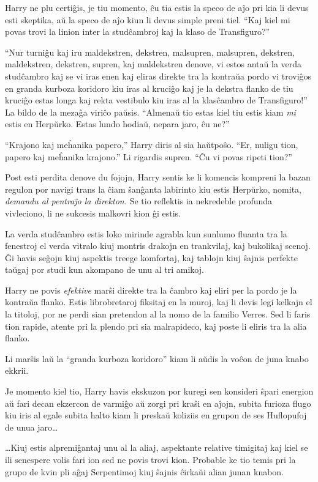 Harry ne plu certiĝis, je tiu momento, ĉu tia estis la speco de aĵo pri kia li
devus esti skeptika, aŭ la speco de aĵo kiun li devus simple preni tiel. ``Kaj
kiel mi povas trovi la linion inter la studĉambroj kaj la klaso de
Transfiguro?''

``Nur turniĝu kaj iru maldekstren, dekstren, malsupren, malsupren, dekstren,
maldekstren, dekstren, supren, kaj maldekstren denove, vi estos antaŭ la verda
studĉambro kaj se vi iras enen kaj eliras direkte tra la kontraŭa pordo vi
troviĝos en granda kurboza koridoro kiu iras al kruciĝo kaj je la dekstra flanko
de tiu kruciĝo estas longa kaj rekta vestibulo kiu iras al la klasĉambro de
Transfiguro!'' La bildo de la mezaĝa viriĉo paŭsis. ``Almenaŭ tio estas kiel tiu
estis kiam \emph{mi} estis en Herpŭrko. Estas lundo hodiaŭ, nepara jaro, ĉu
ne?''

``Krajono kaj meĥanika papero,'' Harry diris al sia haŭtpoŝo. ``Er,
nuligu tion, papero kaj meĥanika krajono.'' Li rigardis supren. ``Ĉu
vi povas ripeti tion?''

Post esti perdita denove du fojojn, Harry sentis ke li komencis kompreni la bazan
regulon por navigi trans la ĉiam ŝanĝanta labirinto kiu estis Herpŭrko, nomita,
\emph{demandu al pentraĵo la direkton.} Se tio reflektis ia nekredeble profunda
vivleciono, li ne sukcesis malkovri kion ĝi estis.

La verda studĉambro estis loko mirinde agrabla kun sunlumo fluanta tra
la fenestroj el verda vitralo kiuj montris drakojn en trankvilaj, kaj
bukolikaj scenoj. Ĝi havis seĝojn kiuj aspektis treege komfortaj, kaj
tablojn kiuj ŝajnis perfekte taŭgaj por studi kun akompano de unu al
tri amikoj. 

Harry ne povis \emph{efektive} marŝi direkte tra la ĉambro kaj eliri per la
pordo je la kontraŭa flanko. Estis librobretaroj fiksitaj en la muroj, kaj li
devis legi kelkajn el la titoloj, por ne perdi sian pretendon al la nomo de la
familio Verres. Sed li faris tion rapide, atente pri la plendo pri sia
malrapideco, kaj poste li eliris tra la alia flanko.

Li marŝis laŭ la ``granda kurboza koridoro'' kiam li aŭdis la voĉon de
juna knabo ekkrii.

Je momento kiel tio, Harry havis ekskuzon por kuregi sen konsideri ŝpari
energion aŭ fari decan ekzercon de varmiĝo aŭ zorgi pri kraŝi en aĵojn, subita
furioza flugo kiu iris al egale subita halto kiam li preskaŭ koliziis en
grupon de ses Huflopufoj de unua jaro\ldots

\ldots Kiuj estis alpremiĝantaj unu al la aliaj, aspektante relative timigitaj
kaj kiel se ili senespere volis fari ion sed ne povis trovi kion. Probable ke
tio temis pri la grupo de kvin pli aĝaj Serpentimoj kiuj ŝajnis ĉirkaŭi alian
junan knabon.

